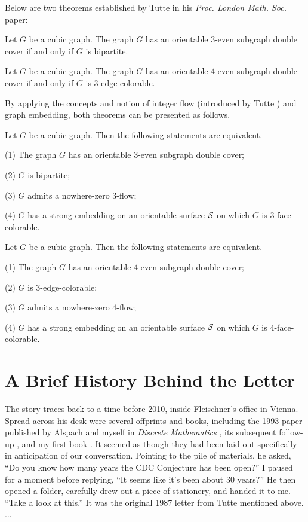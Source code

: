 \documentclass[11pt]{article}
\begin{document}
     Below are two theorems established by Tutte in his {\em Proc. London Math. Soc.} paper:
     \begin{theorem}
     Let \(G\) be a cubic graph. The graph \(G\) has an orientable \(3\)-even subgraph double cover if and only if \(G\) is bipartite.
     \end{theorem}

     \begin{theorem}
     Let \(G\) be a cubic graph. The graph \(G\) has an orientable \(4\)-even subgraph double cover if and only if \(G\) is \(3\)-edge-colorable.\end{theorem}

By applying the concepts and notion
 of integer flow (introduced by Tutte  \cite{Tutte1949} \cite{Tutte1954}) and
  graph embedding, both theorems can be presented as follows.

\begin{corollary}
  Let \(G\) be a cubic graph.
   Then the following statements are equivalent.

  (1) The graph \(G\) has an orientable \(3\)-even subgraph double cover;

  (2) \(G\) is bipartite;

  (3) $G$ admits a nowhere-zero $3$-flow;

  (4) $G$ has a strong embedding on an orientable surface ${\cal S}$ on which $G$ is $3$-face-colorable.
  \end{corollary}

  \begin{corollary}
  Let \(G\) be a cubic graph.
   Then the following statements are equivalent.

  (1) The graph \(G\) has an orientable \(4\)-even subgraph double cover;

  (2) \(G\) is $3$-edge-colorable;

  (3) $G$ admits a nowhere-zero $4$-flow;

  (4) $G$ has a strong embedding on an orientable surface ${\cal S}$ on which $G$ is $4$-face-colorable.
  \end{corollary}

     \section{A Brief History Behind the Letter}
     The story traces back to a time before 2010, inside Fleischner's office in Vienna. Spread across his desk were several offprints and books, including the 1993 paper published by Alspach and myself in {\em Discrete Mathematics} \cite{Alspach1993}, its subsequent follow-up \cite{Alspach1994}, and my first book \cite{ZhangBook1}. It seemed as though they had been laid out specifically in anticipation of our conversation.
     Pointing to the pile of materials, he asked,
     ``Do you know how many years the CDC Conjecture has been open?''
      I paused for a moment before replying, ``It seems like it's been about 30 years?''
      He then opened a folder, carefully drew out a piece of stationery, and handed it to me.
      ``Take a look at this.''
      It was the original 1987 letter from Tutte mentioned above. \(\dots \)
\end{document}
